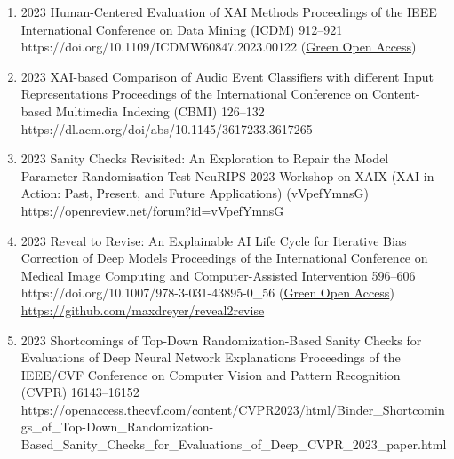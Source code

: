 {\begin{enumerate}
        \item {}
                            {2023}
                            {Human-Centered Evaluation of XAI Methods}
                            {Proceedings of the IEEE International Conference on Data Mining (ICDM)}
                            {912--921}
                            {https://doi.org/10.1109/ICDMW60847.2023.00122}
                            {(\href{https://arxiv.org/abs/2310.07534}{Green Open Access})}
                   
        \item {}
                            {2023}
                            {XAI-based Comparison of Audio Event Classifiers with different Input Representations}
                            {Proceedings of the International Conference on Content-based Multimedia Indexing (CBMI)}
                            {126--132}
                            {https://dl.acm.org/doi/abs/10.1145/3617233.3617265}


        \item {}
                            {2023}
                            {Sanity Checks Revisited: An Exploration to Repair the Model Parameter Randomisation Test}
                            {NeuRIPS 2023 Workshop on XAIX (XAI in Action: Past, Present, and Future Applications)}
                            {(vVpefYmnsG)}
                            {https://openreview.net/forum?id=vVpefYmnsG} 

        \item {}
                            {2023}
                            {Reveal to Revise: An Explainable AI Life Cycle for Iterative Bias Correction of Deep Models}
                            {Proceedings of the International Conference on Medical Image Computing and Computer-Assisted Intervention}
                            {596--606}
                            {https://doi.org/10.1007/978-3-031-43895-0_56}
                            {(\href{https://arxiv.org/abs/2303.12641}{Green Open Access})\\ \href{https://github.com/maxdreyer/reveal2revise}{https://github.com/maxdreyer/reveal2revise}}


        \item {}
                            {2023}
                            {Shortcomings of Top-Down Randomization-Based Sanity Checks for Evaluations of Deep Neural Network Explanations}
                            {Proceedings of the IEEE/CVF Conference on Computer Vision and Pattern Recognition (CVPR)}
                            {16143--16152}
                            {https://openaccess.thecvf.com/content/CVPR2023/html/Binder_Shortcomings_of_Top-Down_Randomization-Based_Sanity_Checks_for_Evaluations_of_Deep_CVPR_2023_paper.html}


\end{enumerate}}
